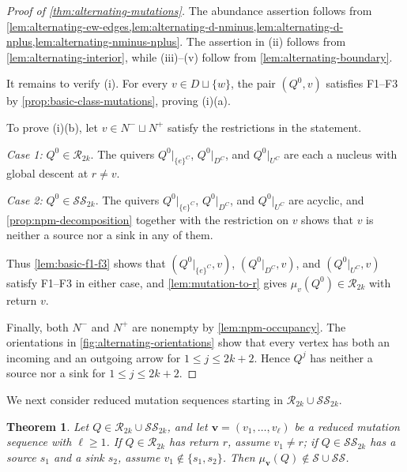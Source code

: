 \documentclass[10pt,a4paper]{amsart}
\newtheorem{theorem}{Theorem}[section]
\theoremstyle{definition}
\theoremstyle{definition}
\numberwithin{equation}{section}
\numberwithin{table}{section}
\newcommand{\nminus}{N^{-}}
\newcommand{\nplus}{N^{+}}
\newcommand{\Rclass}{\mathcal{R}}
\newcommand{\SSclass}{\mathcal{SS}}
\newcommand{\Sclass}{\mathcal{S}}
\newcommand{\Qalt}[1]{Q^{#1}}
\begin{document}
\begin{proof}[Proof of \cref{thm:alternating-mutations}]
The abundance assertion follows from
\cref{lem:alternating-ew-edges,lem:alternating-d-nminus,lem:alternating-d-nplus,lem:alternating-nminus-nplus}.
The assertion in \textup{(ii)} follows from \cref{lem:alternating-interior},
while \textup{(iii)--(v)} follow from \cref{lem:alternating-boundary}.

It remains to verify \textup{(i)}. For every $v\in D\sqcup\{w\}$, the pair
$(\Qalt{0},v)$ satisfies F1--F3 by \cref{prop:basic-class-mutations}, proving
\textup{(i)(a)}.

To prove \textup{(i)(b)}, let $v\in\nminus\sqcup\nplus$ satisfy the
restrictions in the statement.

\emph{Case 1:} $\Qalt{0}\in\Rclass_{2k}$.
The quivers $\Qalt{0}|_{\{e\}^C}$, $\Qalt{0}|_{D^C}$, and
$\Qalt{0}|_{U^C}$ are each a nucleus with global descent at $r\ne v$.

\emph{Case 2:} $\Qalt{0}\in\SSclass_{2k}$.
The quivers $\Qalt{0}|_{\{e\}^C}$, $\Qalt{0}|_{D^C}$, and
$\Qalt{0}|_{U^C}$ are acyclic, and \cref{prop:npm-decomposition} together
with the restriction on $v$ shows that $v$ is neither a source nor a sink
in any of them.

Thus
\cref{lem:basic-f1-f3} shows that $(\Qalt{0}|_{\{e\}^C},v)$,
$(\Qalt{0}|_{D^C},v)$, and $(\Qalt{0}|_{U^C},v)$ satisfy F1--F3 in either
case, and \cref{lem:mutation-to-r} gives
$\mu_v(\Qalt{0})\in\Rclass_{2k}$ with return $v$.

Finally, both $\nminus$ and $\nplus$ are nonempty by
\cref{lem:npm-occupancy}. The
orientations in \cref{fig:alternating-orientations} show that every vertex has
both an incoming and an outgoing arrow for $1\le j\le2k+2$. Hence $\Qalt{j}$
has neither a source nor a sink for $1\le j\le2k+2$.
\end{proof}


We next consider reduced mutation sequences starting in
$\Rclass_{2k}\cup\SSclass_{2k}$.

\begin{theorem}\label{thm:r2k-ss-sequences}
Let $Q\in\Rclass_{2k}\cup\SSclass_{2k}$, and let
$\mathbf v=(v_1,\ldots,v_\ell)$ be a reduced mutation sequence with
$\ell\ge1$. If $Q\in\Rclass_{2k}$ has return $r$, assume $v_1\ne r$; if
$Q\in\SSclass_{2k}$ has a source $s_1$ and a sink $s_2$, assume
$v_1\notin\{s_1,s_2\}$. Then $\mu_{\mathbf v}(Q)\notin\Sclass\cup\SSclass$.
\end{theorem}
\end{document}
